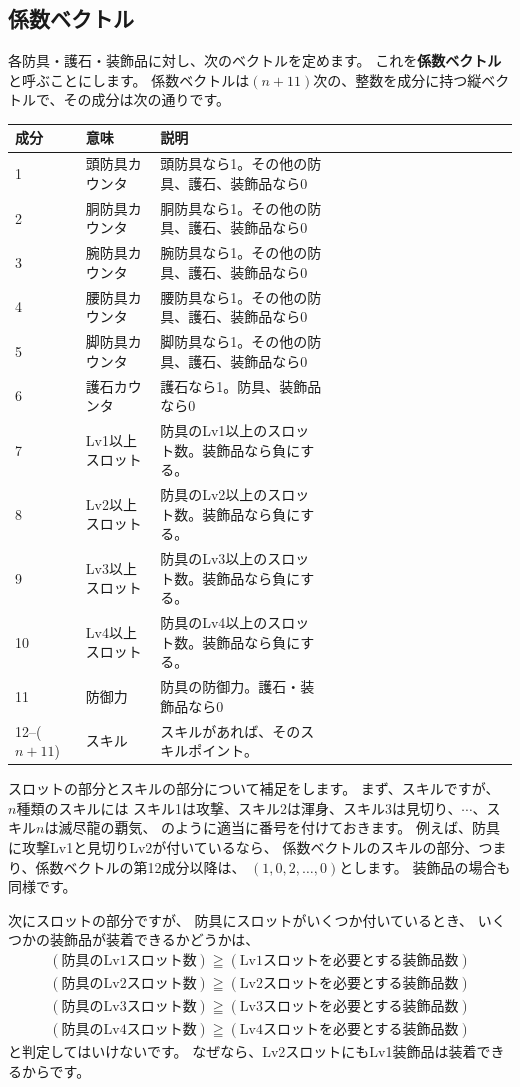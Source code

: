 \documentclass{jsarticle}
\begin{document}
\subsection{係数ベクトル}

各防具・護石・装飾品に対し、次のベクトルを定めます。
これを{\bf 係数ベクトル}と呼ぶことにします。
係数ベクトルは$(n+11)$次の、整数を成分に持つ縦ベクトルで、その成分は次の通りです。
\begin{center}
\begin{tabular}{llllllllllllllll}
\toprule
成分 & 意味 & 説明 \\
\midrule
1 & 頭防具カウンタ & 頭防具なら1。その他の防具、護石、装飾品なら0 \\
2 & 胴防具カウンタ &  胴防具なら1。その他の防具、護石、装飾品なら0 \\
3 & 腕防具カウンタ &  腕防具なら1。その他の防具、護石、装飾品なら0 \\
4 & 腰防具カウンタ &  腰防具なら1。その他の防具、護石、装飾品なら0 \\
5 & 脚防具カウンタ &  脚防具なら1。その他の防具、護石、装飾品なら0 \\
\midrule
6 & 護石カウンタ   &  護石なら1。防具、装飾品なら0 \\
\midrule
7 & Lv1以上スロット & 防具のLv1以上のスロット数。装飾品なら負にする。\\
8 & Lv2以上スロット & 防具のLv2以上のスロット数。装飾品なら負にする。\\
9 & Lv3以上スロット & 防具のLv3以上のスロット数。装飾品なら負にする。\\
10 & Lv4以上スロット & 防具のLv4以上のスロット数。装飾品なら負にする。\\
\midrule
11 & 防御力 & 防具の防御力。護石・装飾品なら0 \\
\midrule
12--($n+11$) & スキル & スキルがあれば、そのスキルポイント。
\\ \bottomrule
\end{tabular}
\end{center}

スロットの部分とスキルの部分について補足をします。
まず、スキルですが、
$n$種類のスキルには
スキル1は攻撃、スキル2は渾身、スキル3は見切り、$\cdots$、スキル$n$は滅尽龍の覇気、
のように適当に番号を付けておきます。
例えば、防具に攻撃Lv1と見切りLv2が付いているなら、
係数ベクトルのスキルの部分、つまり、係数ベクトルの第12成分以降は、
$(1, 0, 2, \ldots, 0)$とします。
%
装飾品の場合も同様です。

次にスロットの部分ですが、
防具にスロットがいくつか付いているとき、
いくつかの装飾品が装着できるかどうかは、
\begin{align*}
(\text{防具のLv1スロット数}) \geqq (\text{Lv1スロットを必要とする装飾品数}) \\
(\text{防具のLv2スロット数}) \geqq (\text{Lv2スロットを必要とする装飾品数}) \\
(\text{防具のLv3スロット数}) \geqq (\text{Lv3スロットを必要とする装飾品数}) \\
(\text{防具のLv4スロット数}) \geqq (\text{Lv4スロットを必要とする装飾品数}) 
\end{align*}
と判定してはいけないです。
なぜなら、Lv2スロットにもLv1装飾品は装着できるからです。
\end{document}
